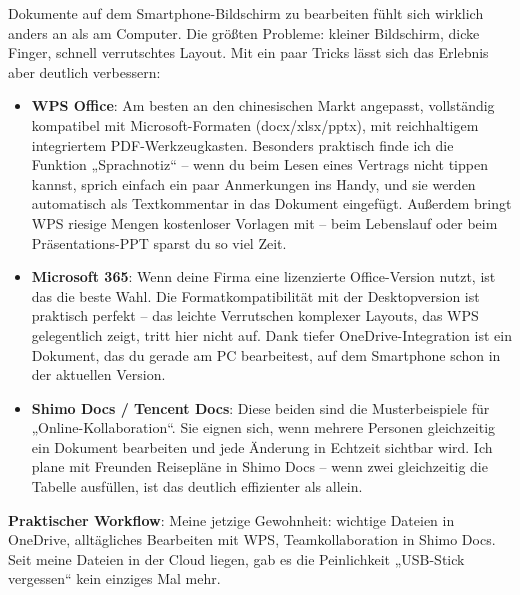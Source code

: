 


Dokumente auf dem Smartphone-Bildschirm zu bearbeiten fühlt sich wirklich anders an als am Computer. Die größten Probleme: kleiner Bildschirm, dicke Finger, schnell verrutschtes Layout. Mit ein paar Tricks lässt sich das Erlebnis aber deutlich verbessern:

\begin{itemize}
  \item \textbf{WPS Office}: Am besten an den chinesischen Markt angepasst, vollständig kompatibel mit Microsoft-Formaten (docx/xlsx/pptx), mit reichhaltigem integriertem PDF-Werkzeugkasten. Besonders praktisch finde ich die Funktion „Sprachnotiz“ – wenn du beim Lesen eines Vertrags nicht tippen kannst, sprich einfach ein paar Anmerkungen ins Handy, und sie werden automatisch als Textkommentar in das Dokument eingefügt. Außerdem bringt WPS riesige Mengen kostenloser Vorlagen mit – beim Lebenslauf oder beim Präsentations-PPT sparst du so viel Zeit.
  \item \textbf{Microsoft 365}: Wenn deine Firma eine lizenzierte Office-Version nutzt, ist das die beste Wahl. Die Formatkompatibilität mit der Desktopversion ist praktisch perfekt – das leichte Verrutschen komplexer Layouts, das WPS gelegentlich zeigt, tritt hier nicht auf. Dank tiefer OneDrive-Integration ist ein Dokument, das du gerade am PC bearbeitest, auf dem Smartphone schon in der aktuellen Version.
  \item \textbf{Shimo Docs / Tencent Docs}: Diese beiden sind die Musterbeispiele für „Online-Kollaboration“. Sie eignen sich, wenn mehrere Personen gleichzeitig ein Dokument bearbeiten und jede Änderung in Echtzeit sichtbar wird. Ich plane mit Freunden Reisepläne in Shimo Docs – wenn zwei gleichzeitig die Tabelle ausfüllen, ist das deutlich effizienter als allein.
\end{itemize}

\textbf{Praktischer Workflow}: Meine jetzige Gewohnheit: wichtige Dateien in OneDrive, alltägliches Bearbeiten mit WPS, Teamkollaboration in Shimo Docs. Seit meine Dateien in der Cloud liegen, gab es die Peinlichkeit „USB-Stick vergessen“ kein einziges Mal mehr.

